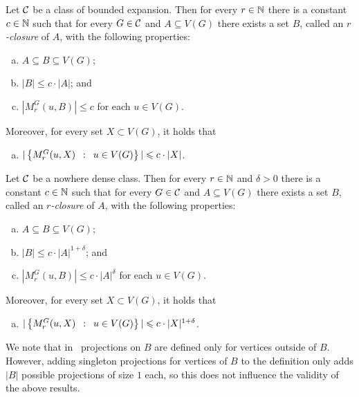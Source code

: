 \begin{lemma}\label{lem:closure-be}
Let $\mathcal{C}$ be a class of bounded expansion. 
Then for every $r\in \mathbb{N}$ there is a constant $c\in \mathbb{N}$ such that for
every $G\in \mathcal{C}$ and $A\subseteq V(G)$ there exists a set $B$, called an {\em{$r$-closure}} of $A$, with the following properties:
\begin{enumerate}[(a)]
  \item $A\subseteq B\subseteq V(G)$;
  \item $|B|\leq c\cdot |A|$; and
  \item $|M_r^G(u,B)|\leq c$ for each $u\in V(G)$.
  \end{enumerate}
  Moreover, for every set $X\subset V(G)$, it holds that
  \begin{enumerate}[(d)]
  \item $|\left\{M_r^G(u,X) \,~:~\, u\in V(G) \right\}|\leqslant c\cdot |X|$.
\end{enumerate}
\end{lemma}

\begin{lemma}\label{lem:closure-nd}
Let $\mathcal{C}$ be a nowhere dense class. 
Then for every $r\in\mathbb{N}$ and $\delta>0$ there is a 
constant $c\in\mathbb{N}$ such that for every $G\in \mathcal{C}$ and $A\subseteq V(G)$ there exists a set 
$B$,  called an {\em{$r$-closure}} of $A$, 
with the following properties: 
\begin{enumerate}[(a)]
  \item $A\subseteq B\subseteq V(G)$;
  \item $|B|\leq c\cdot |A|^{1+\delta}$; and
  \item $|M_r^G(u,B)|\leq c\cdot |A|^{\delta}$ for each $u\in V(G)$.
  \end{enumerate}
  Moreover, for every set $X\subset V(G)$, it holds that
  \begin{enumerate}[(d)]  
  \item $|\left\{M_r^G(u,X) \,~:~\, u\in V(G) \right\}|\leqslant c\cdot |X|^{1+\delta}$.
\end{enumerate}
\end{lemma}

We note that in~\cite{drange2016kernelization,eickmeyer2016neighborhood} projections on $B$ are defined only for vertices outside of $B$. 
However, adding singleton projections for vertices of $B$ to the definition only adds $|B|$ possible projections of size $1$ each, so this does not influence the validity of the above results.

